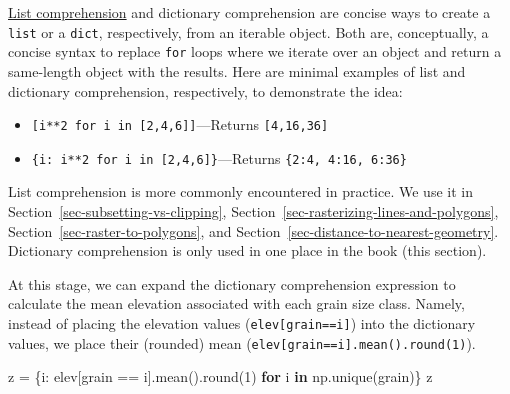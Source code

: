 \documentclass[
  letterpaper,
]{krantz}
\newenvironment{Shaded}{\begin{snugshade}}{\end{snugshade}}
\newcommand{\BuiltInTok}[1]{\textcolor[rgb]{0.00,0.23,0.31}{#1}}
\newcommand{\ControlFlowTok}[1]{\textcolor[rgb]{0.00,0.23,0.31}{\textbf{#1}}}
\newcommand{\DecValTok}[1]{\textcolor[rgb]{0.68,0.00,0.00}{#1}}
\newcommand{\KeywordTok}[1]{\textcolor[rgb]{0.00,0.23,0.31}{\textbf{#1}}}
\newcommand{\NormalTok}[1]{\textcolor[rgb]{0.00,0.23,0.31}{#1}}
\newcommand{\OperatorTok}[1]{\textcolor[rgb]{0.37,0.37,0.37}{#1}}
\providecommand{\tightlist}{%
  \setlength{\itemsep}{0pt}\setlength{\parskip}{0pt}}\usepackage{longtable,booktabs,array}
\begin{document}
\begin{tcolorbox}[enhanced jigsaw, title=\textcolor{quarto-callout-note-color}{\faInfo}\hspace{0.5em}{Note}, coltitle=black, colbacktitle=quarto-callout-note-color!10!white, breakable, titlerule=0mm, colframe=quarto-callout-note-color-frame, opacitybacktitle=0.6, colback=white, bottomrule=.15mm, left=2mm, leftrule=.75mm, toprule=.15mm, toptitle=1mm, bottomtitle=1mm, arc=.35mm, opacityback=0, rightrule=.15mm]

\href{https://docs.python.org/3/tutorial/datastructures.html\#list-comprehensions}{List
comprehension} and dictionary comprehension are concise ways to create a
\texttt{list} or a \texttt{dict}, respectively, from an iterable object.
Both are, conceptually, a concise syntax to replace \texttt{for} loops
where we iterate over an object and return a same-length object with the
results. Here are minimal examples of list and dictionary comprehension,
respectively, to demonstrate the idea:

\begin{itemize}
\tightlist
\item
  \texttt{{[}i**2\ for\ i\ in\ {[}2,4,6{]}{]}}---Returns
  \texttt{{[}4,16,36{]}}
\item
  \texttt{\{i:\ i**2\ for\ i\ in\ {[}2,4,6{]}\}}---Returns
  \texttt{\{2:4,\ 4:16,\ 6:36\}}
\end{itemize}

List comprehension is more commonly encountered in practice. We use it
in Section~\ref{sec-subsetting-vs-clipping},
Section~\ref{sec-rasterizing-lines-and-polygons},
Section~\ref{sec-raster-to-polygons}, and
Section~\ref{sec-distance-to-nearest-geometry}. Dictionary comprehension
is only used in one place in the book (this section).

\end{tcolorbox}

At this stage, we can expand the dictionary comprehension expression to
calculate the mean elevation associated with each grain size class.
Namely, instead of placing the elevation values
(\texttt{elev{[}grain==i{]}}) into the dictionary values, we place their
(rounded) mean (\texttt{elev{[}grain==i{]}.mean().round(1)}).

\begin{Shaded}
\begin{Highlighting}[]
\NormalTok{z }\OperatorTok{=}\NormalTok{ \{i: elev[grain }\OperatorTok{==}\NormalTok{ i].mean().}\BuiltInTok{round}\NormalTok{(}\DecValTok{1}\NormalTok{) }\ControlFlowTok{for}\NormalTok{ i }\KeywordTok{in}\NormalTok{ np.unique(grain)\}}
\NormalTok{z}
\end{Highlighting}
\end{Shaded}
\end{document}

